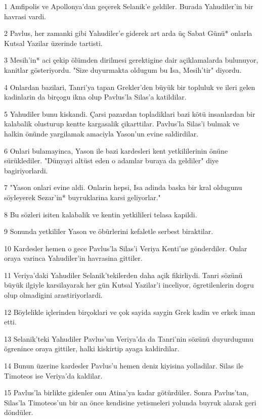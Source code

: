 \par 1 Amfipolis ve Apollonya'dan geçerek Selanik'e geldiler. Burada Yahudiler'in bir havrasi vardi.
\par 2 Pavlus, her zamanki gibi Yahudiler'e giderek art arda üç Sabat Günü* onlarla Kutsal Yazilar üzerinde tartisti.
\par 3 Mesih'in* aci çekip ölümden dirilmesi gerektigine dair açiklamalarda bulunuyor, kanitlar gösteriyordu. "Size duyurmakta oldugum bu Isa, Mesih'tir" diyordu.
\par 4 Onlardan bazilari, Tanri'ya tapan Grekler'den büyük bir topluluk ve ileri gelen kadinlarin da birçogu ikna olup Pavlus'la Silas'a katildilar.
\par 5 Yahudiler bunu kiskandi. Çarsi pazardan topladiklari bazi kötü insanlardan bir kalabalik olusturup kentte kargasalik çikarttilar. Pavlus'la Silas'i bulmak ve halkin önünde yargilamak amaciyla Yason'un evine saldirdilar.
\par 6 Onlari bulamayinca, Yason ile bazi kardesleri kent yetkililerinin önüne sürüklediler. "Dünyayi altüst eden o adamlar buraya da geldiler" diye bagiriyorlardi.
\par 7 "Yason onlari evine aldi. Onlarin hepsi, Isa adinda baska bir kral oldugunu söyleyerek Sezar'in* buyruklarina karsi geliyorlar."
\par 8 Bu sözleri isiten kalabalik ve kentin yetkilileri telasa kapildi.
\par 9 Sonunda yetkililer Yason ve öbürlerini kefaletle serbest biraktilar.
\par 10 Kardesler hemen o gece Pavlus'la Silas'i Veriya Kenti'ne gönderdiler. Onlar oraya varinca Yahudiler'in havrasina gittiler.
\par 11 Veriya'daki Yahudiler Selanik'tekilerden daha açik fikirliydi. Tanri sözünü büyük ilgiyle karsilayarak her gün Kutsal Yazilar'i inceliyor, ögretilenlerin dogru olup olmadigini arastiriyorlardi.
\par 12 Böylelikle içlerinden birçoklari ve çok sayida saygin Grek kadin ve erkek iman etti.
\par 13 Selanik'teki Yahudiler Pavlus'un Veriya'da da Tanri'nin sözünü duyurdugunu ögrenince oraya gittiler, halki kiskirtip ayaga kaldirdilar.
\par 14 Bunun üzerine kardesler Pavlus'u hemen deniz kiyisina yolladilar. Silas ile Timoteos ise Veriya'da kaldilar.
\par 15 Pavlus'la birlikte gidenler onu Atina'ya kadar götürdüler. Sonra Pavlus'tan, Silas'la Timoteos'un bir an önce kendisine yetismeleri yolunda buyruk alarak geri döndüler.
